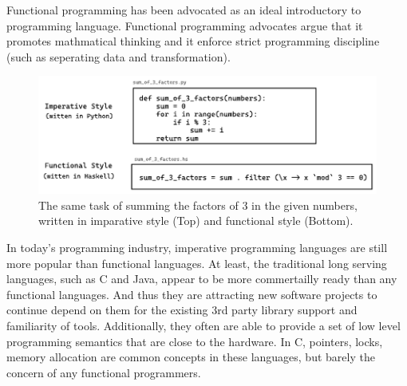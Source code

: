 Functional programming has been advocated as an ideal introductory to programming language. Functional programming advocates argue that it promotes mathmatical thinking and it enforce strict programming discipline (such as seperating data and transformation). 

\begin{figure}[hbt]
  \includegraphics[width=\linewidth]{ImperativeFunctional}
  \caption{
    \label{fig:imperative-vs-functional}
   The same task of summing the factors of 3 in the given numbers, written in imparative style (Top) and functional style (Bottom).
    }
\end{figure}

In today's programming industry, imperative programming languages are still more popular than functional languages. At least, the traditional long serving languages, such as C and Java, appear to be more commertailly ready than any functional languages. And thus they are attracting new software projects to continue depend on them for the existing 3rd party library support and familiarity of tools.  Additionally, they often are able to provide a set of low level programming semantics that are close to the hardware. In C, pointers, locks, memory allocation are common concepts in these languages, but barely the concern of any functional programmers.


